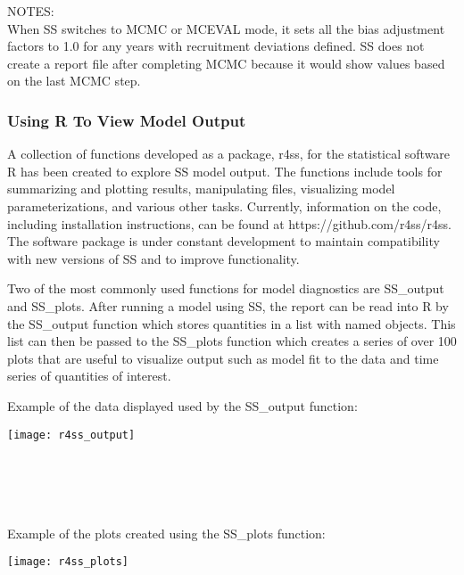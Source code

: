 \noindent NOTES:\\
When SS switches to MCMC or MCEVAL mode, it sets all the bias adjustment factors to 1.0 for any years with recruitment deviations defined.  SS does not create a report file after completing MCMC because it would show values based on the last MCMC step.

\subsubsection{Using R To View Model Output}
A collection of functions developed as a package, r4ss, for the statistical software R has been created to explore SS model output.  The functions include tools for summarizing and plotting results, manipulating files, visualizing model parameterizations, and various other tasks.  Currently, information on the code, including installation instructions, can be found at https://github.com/r4ss/r4ss.  The software package is under constant development to maintain compatibility with new versions of SS and to improve functionality. 

Two of the most commonly used functions for model diagnostics are SS\_output and SS\_plots.  After running a model using SS, the report can be read into R by the SS\_output function which stores quantities in a list with named objects.  This list can then be passed to the SS\_plots function which creates a series of over 100 plots that are useful to visualize output such as model fit to the data and time series of quantities of interest. 

Example of the data displayed used by the SS\_output function:
\begin{center}
	\texttt{[image: r4ss\_output]}
\end{center}
\hfil\\
\hfil\\
\hfil\\
\hfil\\
Example of the plots created using the SS\_plots function:
\begin{center}
	\texttt{[image: r4ss\_plots]}
\end{center}

